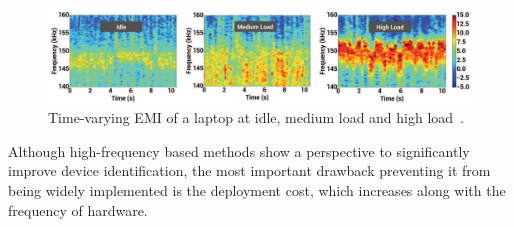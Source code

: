 \begin{figure}
\centering
\includegraphics[width=1\textwidth]{./chapters/chapter2/images/DOSE.pdf} 
\caption{Time-varying EMI of a laptop at idle, medium load and high load~\cite{Chen15}.} 
\label{fig:A19} 
\end{figure}
Although high-frequency based methods show a perspective to significantly improve device identification, the most important drawback preventing it from being widely implemented is the deployment cost, which increases along with the frequency of hardware.